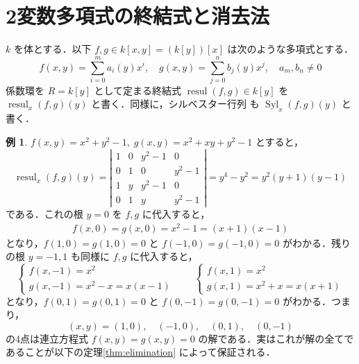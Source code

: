\documentclass[12pt, uplatex, dvipdfmx]{jsarticle}
\theoremstyle{definition}
\newtheorem{example}{例}
\newtheorem*{remark}{注意}
\DeclareMathOperator{\Syl}{Syl}
\DeclareMathOperator{\resul}{resul}
\begin{document}



\section{2変数多項式の終結式と消去法}

$k$ を体とする．以下 $f, g \in k[x,y] = \left( k\left[ y\right]\right)[x]$ は次のような多項式とする．
\[
  f(x,y) = \sum_{i=0}^{m} a_i(y) x^i, \quad  g(x,y) = \sum_{j=0}^{n} b_j(y) x^j, \quad a_m, b_n \neq 0
\]
係数環を $R=k[y]$ として定まる終結式 $\resul(f,g) \in
k[y]$ を $\resul_x(f,g)(y)$ と書く．同様に，シルベスター行列
も $\Syl_x(f,g)(y)$ と書く．

\begin{example}
  $f(x,y)=x^2+y^2-1,\;  g(x,y)=x^2+xy+y^2-1$ とすると，
  \[
    \resul_x(f,g)(y) = \left|
      \begin{array}{cccc}
        1 & 0 & y^2-1 & 0\\
        0 & 1 & 0 & y^2-1\\
        1 & y & y^2-1 & 0\\
        0 & 1 & y & y^2-1
      \end{array}
    \right| = y^4-y^2 = y^2(y+1)(y-1)
  \]
  である．これの根 $y=0$ を $f,g$ に代入すると，
  \[
    \begin{aligned}
      f(x,0) = g(x,0) = x^2-1 = (x+1)(x-1)
    \end{aligned}
  \]
  となり，$f(1, 0) = g(1, 0) = 0$ と $f(-1,0)=g(-1,0)=0$ がわかる．残り
  の根 $y=-1, 1$ も同様に $f,g$ に代入すると，
  \[
    \begin{cases}
      f(x,-1) = x^2\\
      g(x,-1) = x^2-x=x(x-1)
    \end{cases} \qquad
    \begin{cases}
      f(x,1) = x^2\\
      g(x,1) = x^2+x=x(x+1)
    \end{cases}
  \]
  となり，$f(0, 1) = g(0, 1)=0$ と $f(0,-1)=g(0,-1)=0$ がわかる．つまり，
  \[
    (x,y) = (1,0), \quad (-1,0), \quad (0,1), \quad (0,-1)
  \]
  の4点は連立方程式 $f(x,y)=g(x,y)=0$ の解である．実はこれが解の全てで
  あることが以下の定理\ref{thm:elimination} によって保証される．
\end{example}
\end{document}
